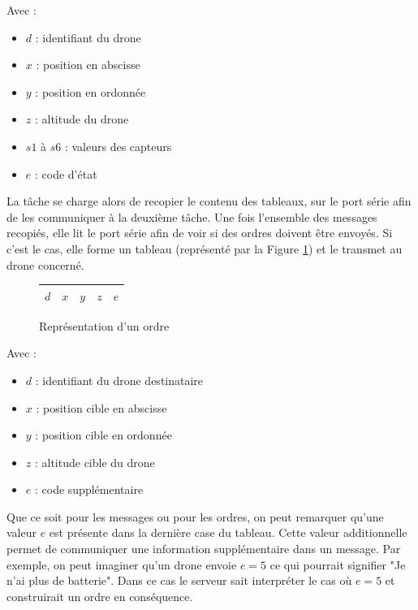 \documentclass[a4paper,10pt]{report}
\begin{document}
	Avec :
	\begin{itemize}
	  \item $d$ : identifiant du drone
	  \item $x$ : position en abscisse
	  \item $y$ : position en ordonnée
	  \item $z$ : altitude du drone
	  \item $s1$ à $s6$ : valeurs des capteurs
	  \item $e$ : code d'état
	\end{itemize}

	La tâche se charge alors de recopier le contenu des tableaux, sur le 
port série afin de les communiquer à la deuxième tâche. Une fois l'ensemble des 
messages recopiés, elle lit le port série afin de voir si des ordres doivent 
être envoyés. Si c'est le cas, elle forme un tableau (représenté par la 
Figure \ref{message_serveur}) et le transmet au drone concerné.

	\begin{figure}
	  \begin{center}
	    \begin{tabular}{|c|c|c|c|c|}
	      \hline
	      $d$ & $x$ & $y$ & $z$ & $e$ \\
	      \hline
	    \end{tabular}
	  \end{center}
	  \caption{Représentation d'un ordre}
	  \label{message_serveur}
	\end{figure}
	
	Avec :
	\begin{itemize}
	  \item $d$ : identifiant du drone destinataire
	  \item $x$ : position cible en abscisse
	  \item $y$ : position cible en ordonnée
	  \item $z$ : altitude cible du drone
	  \item $e$ : code supplémentaire
	\end{itemize}
	
	Que ce soit pour les messages ou pour les ordres, on peut remarquer 
qu'une valeur $e$ est présente dans la dernière case du tableau. Cette valeur 
additionnelle permet de communiquer une information supplémentaire dans un 
message. Par exemple, on peut imaginer qu'un drone envoie $e = 5$ ce qui 
pourrait signifier "Je n'ai plus de batterie". Dans ce cas le serveur sait 
interpréter le cas où $e = 5$ et construirait un ordre en conséquence.
\end{document}
